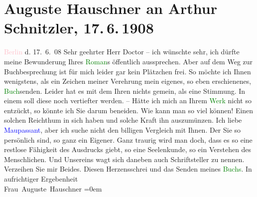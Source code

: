 

               \section[Auguste Hauschner an Arthur Schnitzler, 17. 6. 1908]{ Auguste Hauschner an Arthur Schnitzler, 17. 6. 1908}\nopagebreak{}\rehead{ }\normalsize\beginnumbering{} \toendnotes[C]{\smallbreak\pagebreak[2]} 
\toendnotes[C]{\smallbreak}\pstart
           \raggedleft{}{\pb}\textcolor{pink}{Berlin}{}\ledrightnote{\textcolor{pink}{Berlin}} d. 17. 6. 08\pend
           \pstart
           Sehr geehrter Herr Doctor – ich wünschte sehr, ich dürfte meine
               Bewunderung Ihres \textcolor{green}{Roman}{}s
               öffentlich aussprechen. Aber auf dem Weg zur Buchbesprechung ist für mich leider gar
               kein Plätzchen frei. So möchte ich Ihnen wenigstens, als ein Zeichen meiner Verehrung
               mein eigenes, so eben erschienenes, \textcolor{green}{Buch}{}senden.
               Leider hat es mit dem Ihren nichts gemein, als eine Stimmung. In einem \label{K_L02586-1v}\label{K_L02586-1h} soll diese noch
               vertiefter werden. –\pend
           \pstart
           Hätte ich mich an Ihrem \textcolor{green}{Werk}{}
               nicht so entzückt, so könnte ich Sie darum beneiden. Wie kann man so viel können!
               Einen solchen Reichthum in sich haben und solche Kraft ihn auszumünzen. Ich liebe \textcolor{blue}{Maupassant}{}\ledrightnote{\textcolor{blue}{Guy de Maupassant}}, aber ich suche nicht den billigen
               Vergleich mit Ihnen. Der Sie so persönlich sind, so ganz ein Eigener. {\pb}Ganz traurig wird man doch, dass es so eine restlose
               Fähigkeit des Ausdrucks giebt, so eine Seelenkunde, so ein Verstehen des
               Menschlichen. Und Unsereins wagt sich daneben auch Schriftsteller zu nennen.
               Verzeihen Sie mir Beides. Diesen Herzensschrei und das Senden meines \textcolor{green}{Buchs}{}.\pend
           \pstart
           In aufrichtiger Ergebenheit{\\[\baselineskip]}\spacefill\mbox{Frau Auguste Hauschner}\pend
           \leftskip=0em{}\endnumbering{}  
      